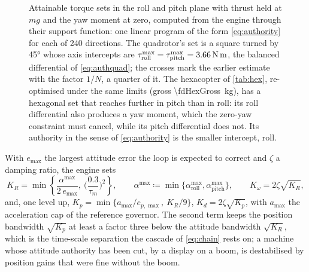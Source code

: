 \begin{figure}[tbp]
\centering

\caption{Attainable torque sets in the roll and pitch plane with thrust held
at $mg$ and the yaw moment at zero, computed from the engine through their
support function: one linear program of the form \cref{eq:authority} for each
of \num{240} directions. The quadrotor's set is a square turned by \ang{45}
whose axis intercepts are
$\tau^{\max}_{\mathrm{roll}}=\tau^{\max}_{\mathrm{pitch}}=\SI{3.66}{\newton\metre}$,
the balanced differential of \cref{eq:authquad}; the crosses mark the earlier
estimate with the factor $1/N$, a quarter of it. The hexacopter of
\cref{tab:hex}, re-optimised under the same limits (gross
\SI{\fdHexGross}{\kilo\gram}), has a hexagonal set that reaches further in
pitch than in roll: its roll
differential also produces a yaw moment, which the zero-yaw constraint must
cancel, while its pitch differential does not. Its authority in the sense of
\cref{eq:authority} is the smaller intercept, roll.}
\label{fig:attainable}
\end{figure}

\begin{model}
\label{mod:gains}
With $e_{\max}$ the largest attitude error the loop is expected to correct and
$\zeta$ a damping ratio, the engine sets
\begin{equation}
  K_R = \min\left\{\frac{\alpha^{\max}}{2\,e_{\max}},\
                   \Big(\frac{0.3}{\tau_m}\Big)^{2}\right\},
  \qquad
  \alpha^{\max} \coloneqq \min\{\alpha_{\mathrm{roll}}^{\max},
                                \alpha_{\mathrm{pitch}}^{\max}\},
  \qquad
  K_\omega = 2\zeta\sqrt{K_R} ,
  \label{eq:kr}
\end{equation}
and, one level up,
$K_p = \min\{a_{\max}/e_{p,\max},\ K_R/9\}$, $K_d = 2\zeta\sqrt{K_p}$, with
$a_{\max}$ the acceleration cap of the reference governor. The second term
keeps the position bandwidth $\sqrt{K_p}$ at least a factor three below the
attitude bandwidth $\sqrt{K_R}$, which is the time-scale separation the
cascade of \cref{eq:chain} rests on; a machine whose attitude authority has
been cut, by a display on a boom, is destabilised by position gains that were
fine without the boom.
\end{model}

